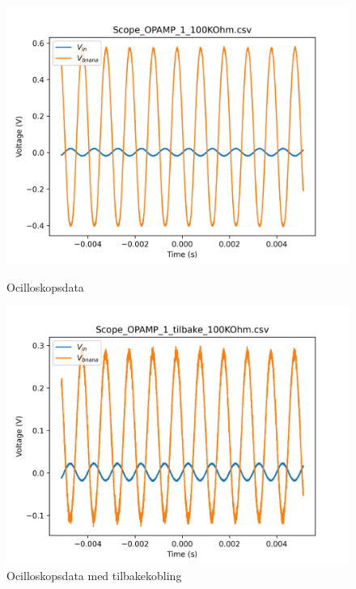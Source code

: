 \begin{figure}
    \begin{minipage}[c]{0.5\textwidth}
        \centering
        \includegraphics[width=1\textwidth]{Bilder/Scope_OPAMP_1_100KOhm.png}
        \caption{Ocilloskopsdata}
        \label{fig:ocilloskop_data}
    \end{minipage}
    \begin{minipage}[c]{0.5\textwidth}
        \centering
        \includegraphics[width=1\textwidth]{Bilder/Scope_OPAMP_1_tilbake_100KOhm.png}
        \caption{Ocilloskopsdata med tilbakekobling}
        \label{fig:ocilloskop_data_tilbake}
    \end{minipage}
\end{figure}



